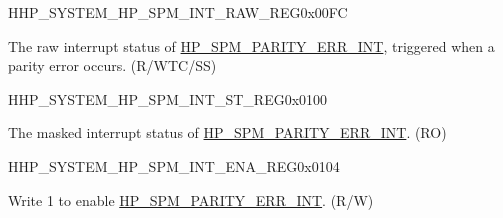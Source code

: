 \begin{register}{H}{HP\_SYSTEM\_HP\_SPM\_INT\_RAW\_REG}{0x00FC}\label{regdesc:HPSYSTEMHPSPMINTRAWREG}
%
%
\regnewline%
\begin{regdesc}\begin{reglist}
\label{fielddesc:HPSYSTEMHPSPMPARITYERRINTRAW}\item [HP\_SYSTEM\_HP\_SPM\_PARITY\_ERR\_INT\_RAW] The raw interrupt status of \hyperref[tab:sysreg-int-sources]{HP\_SPM\_PARITY\_ERR\_INT}, triggered when a parity error occurs. (R/WTC/SS)
\end{reglist}\end{regdesc}
\end{register}


\begin{register}{H}{HP\_SYSTEM\_HP\_SPM\_INT\_ST\_REG}{0x0100}\label{regdesc:HPSYSTEMHPSPMINTSTREG}
%
%
\regnewline%
\begin{regdesc}\begin{reglist}
\label{fielddesc:HPSYSTEMHPSPMPARITYERRINTST}\item [HP\_SYSTEM\_HP\_SPM\_PARITY\_ERR\_INT\_ST] The masked interrupt status of \hyperref[tab:sysreg-int-sources]{HP\_SPM\_PARITY\_ERR\_INT}. (RO)
\end{reglist}\end{regdesc}
\end{register}


\begin{register}{H}{HP\_SYSTEM\_HP\_SPM\_INT\_ENA\_REG}{0x0104}\label{regdesc:HPSYSTEMHPSPMINTENAREG}
%
%
\regnewline%
\begin{regdesc}\begin{reglist}
\label{fielddesc:HPSYSTEMHPSPMPARITYERRINTENA}\item [HP\_SYSTEM\_HP\_SPM\_PARITY\_ERR\_INT\_ENA] Write 1 to enable \hyperref[tab:sysreg-int-sources]{HP\_SPM\_PARITY\_ERR\_INT}. (R/W)
\end{reglist}\end{regdesc}
\end{register}


